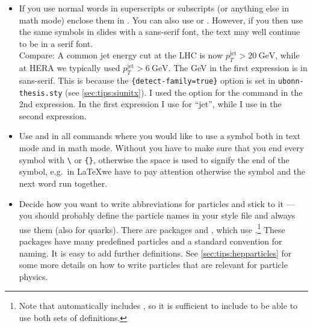 \begin{itemize}
\item If you use normal words in superscripts or subscripts (or
  anything else in math mode) enclose them in . You can
  also use  or . However, if you then use
  the same symbols in slides with a sans-serif font, the text may well
  continue to be in a
  serif font.\\
  {\sffamily Compare: A common jet energy cut at the LHC is now
    \(p_{T}^{\text{jet}} > \SI{20}{\GeV}\), while at HERA we typically
    used \(p_{T}^{\mathrm{jet}} > \SI[detect-family=false]{6}{\GeV}\).
  }
  The \si{\GeV} in the first expression is in sans-serif. This is
  because the
  \texttt{\{detect-family=true\}} %
  option is set in \texttt{ubonn-thesis.sty}
  (see \cref{sec:tips:siunitx}).  I used the option
  for the  command in the 2nd expression.
  In the first expression I use  for \enquote{jet}, while
  I use  in the second expression.

\item Use  and
   in all commands where you would
  like to use a symbol both in text mode and in math mode. Without
   you have to make sure that you end every symbol with
  \texttt{\textbackslash} or \texttt{\{\}}, otherwise the space is used
  to signify the end of the symbol, e.g.\ in \LaTeX we have to pay
  attention otherwise the symbol and the next word run together.

\item Decide how you want to write abbreviations for particles and
  stick to it --- you should probably define the particle names in your
  style file and always use them (also for quarks).
  There are packages  and ,
  which use .\footnote{%
    Note that  automatically includes ,
    so it is sufficient to include  to be able to use both sets of definitions.}
  These packages have many predefined particles and a standard convention for naming.
  It is easy to add further definitions.
  See \cref{sec:tips:hepparticles} for some more details on how to write particles
  that are relevant for particle physics.


\end{itemize}
